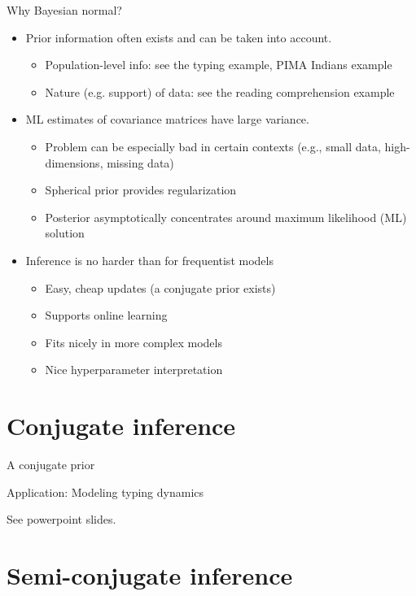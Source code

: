 \documentclass[10pt]{beamer}
\begin{document}
\begin{frame}{Why \alert{Bayesian} normal? }
\begin{itemize}
\item Prior information often exists and can be taken into account.
	\begin{itemize}
	\item Population-level info: see the typing example, PIMA Indians example
	\item Nature (e.g. support) of data: see the reading comprehension example 
	\end{itemize} \pause 	
\item ML estimates of covariance matrices have large variance.
	\begin{itemize}  
	\item Problem can be especially bad in certain contexts (e.g., small data, high-dimensions, missing data)
	\item Spherical prior provides regularization
	\item Posterior asymptotically concentrates around maximum likelihood (ML) solution
	\end{itemize} \pause 
\item Inference is no harder than for frequentist models
	\begin{itemize}
	\item Easy, cheap updates {\scriptsize (a conjugate prior exists)}
	\item Supports online learning 	
	\item Fits nicely in more complex models	
	\item Nice hyperparameter interpretation
	\end{itemize}
\end{itemize}	
\end{frame}

\section{Conjugate inference}

\begin{frame}{A conjugate prior}
\end{frame}

\begin{frame}{Application: Modeling typing dynamics}

See powerpoint slides.	
\end{frame}

\section{Semi-conjugate inference}
\end{document}
